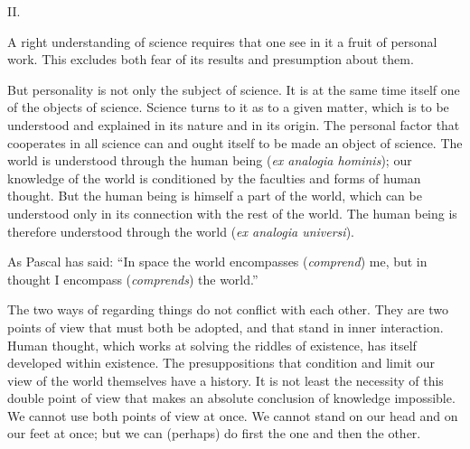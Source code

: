 \documentclass[12pt]{article}
\newcommand{\opage}[1]{\marginnote{\footnotesize\textit{[#1]}}}
\begin{document}
\opage{18}
\begin{center}\large II.\end{center}

A right understanding of science requires that one see in it a fruit of personal
work. This excludes both fear of its results and presumption about them.

But personality is not only the subject of science. It is at the same time
itself one of the objects of science. Science turns to it as to a given matter,
which is to be understood and explained in its nature and in its origin. The
personal factor that cooperates in all science can and ought itself to be made
an object of science. The world is understood through the human being
(\textit{ex analogia hominis}); our knowledge of the world is conditioned by the
faculties and forms of human thought. But the human being is himself a part of
the world, which can be understood only in its connection with the rest of the
world. The human being is therefore understood through the world (\textit{ex
analogia universi}).

As Pascal has said: ``In space the world encompasses
\opage{19}%
(\textit{comprend}) me, but in thought I encompass (\textit{comprends}) the
world.''

The two ways of regarding things do not conflict with each other. They are two
points of view that must both be adopted, and that stand in inner interaction.
Human thought, which works at solving the riddles of existence, has itself
developed within existence. The presuppositions that condition and limit our
view of the world themselves have a history. It is not least the necessity of
this double point of view that makes an absolute conclusion of knowledge
impossible. %
We cannot use both points of view at
once. We cannot stand on our head and on our feet at once; but we can (perhaps)
do first the one and then the other.
\end{document}
